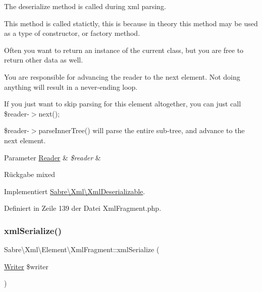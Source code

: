 The deserialize method is called during xml parsing.

This method is called statictly, this is because in theory this method may be used as a type of constructor, or factory method.

Often you want to return an instance of the current class, but you are free to return other data as well.

You are responsible for advancing the reader to the next element. Not doing anything will result in a never-\/ending loop.

If you just want to skip parsing for this element altogether, you can just call \$reader-\/$>$next();

\$reader-\/$>$parse\+Inner\+Tree() will parse the entire sub-\/tree, and advance to the next element.


\begin{DoxyParams}[1]{Parameter}
\mbox{\hyperlink{class_sabre_1_1_xml_1_1_reader}{Reader}} & {\em \$reader} & \\
\hline
\end{DoxyParams}
\begin{DoxyReturn}{Rückgabe}
mixed 
\end{DoxyReturn}


Implementiert \mbox{\hyperlink{interface_sabre_1_1_xml_1_1_xml_deserializable_a19e0eca545b9a0d93f7d6b69085ade30}{Sabre\textbackslash{}\+Xml\textbackslash{}\+Xml\+Deserializable}}.



Definiert in Zeile 139 der Datei Xml\+Fragment.\+php.

\mbox{\label{class_sabre_1_1_xml_1_1_element_1_1_xml_fragment_af7abb5c313d08e5ee12a4dfa37be6b2c}} 
\subsubsection{\texorpdfstring{xml\+Serialize()}{xmlSerialize()}}
{\footnotesize\ttfamily Sabre\textbackslash{}\+Xml\textbackslash{}\+Element\textbackslash{}\+Xml\+Fragment\+::xml\+Serialize (\begin{DoxyParamCaption}\item[{\mbox{\hyperlink{class_sabre_1_1_xml_1_1_writer}{Writer}}}]{\$writer }\end{DoxyParamCaption})}

